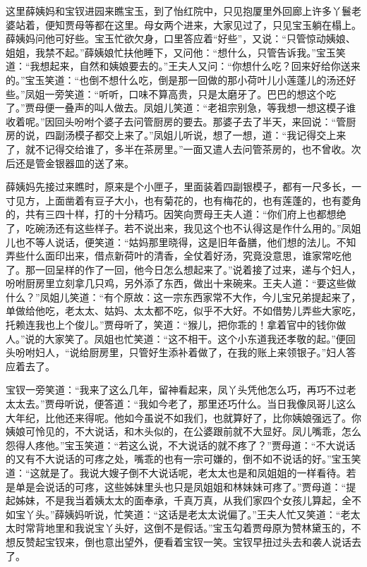 这里薛姨妈和宝钗进园来瞧宝玉，到了怡红院中，只见抱厦里外回廊上许多丫鬟老婆站着，便知贾母等都在这里。母女两个进来，大家见过了，只见宝玉躺在榻上。薛姨妈问他可好些。宝玉忙欲欠身，口里答应着``好些''，又说：``只管惊动姨娘、姐姐，我禁不起。''薛姨娘忙扶他睡下，又问他：``想什么，只管告诉我。''宝玉笑道：``我想起来，自然和姨娘要去的。''王夫人又问：``你想什么吃？回来好给你送来的。''宝玉笑道：``也倒不想什么吃，倒是那一回做的那小荷叶儿小莲蓬儿的汤还好些。''凤姐一旁笑道：``听听，口味不算高贵，只是太磨牙了。巴巴的想这个吃了。''贾母便一叠声的叫人做去。凤姐儿笑道：``老祖宗别急，等我想一想这模子谁收着呢。''因回头吩咐个婆子去问管厨房的要去。那婆子去了半天，来回说：``管厨房的说，四副汤模子都交上来了。''凤姐儿听说，想了一想，道：``我记得交上来了，就不记得交给谁了，多半在茶房里。''一面又遣人去问管茶房的，也不曾收。次后还是管金银器皿的送了来。

薛姨妈先接过来瞧时，原来是个小匣子，里面装着四副银模子，都有一尺多长，一寸见方，上面凿着有豆子大小，也有菊花的，也有梅花的，也有莲蓬的，也有菱角的，共有三四十样，打的十分精巧。因笑向贾母王夫人道：``你们府上也都想绝了，吃碗汤还有这些样子。若不说出来，我见这个也不认得这是作什么用的。''凤姐儿也不等人说话，便笑道：``姑妈那里晓得，这是旧年备膳，他们想的法儿。不知弄些什么面印出来，借点新荷叶的清香，全仗着好汤，究竟没意思，谁家常吃他了。那一回呈样的作了一回，他今日怎么想起来了。''说着接了过来，递与个妇人，吩咐厨房里立刻拿几只鸡，另外添了东西，做出十来碗来。王夫人道：``要这些做什么？''凤姐儿笑道：``有个原故：这一宗东西家常不大作，今儿宝兄弟提起来了，单做给他吃，老太太、姑妈、太太都不吃，似乎不大好。不如借势儿弄些大家吃，托赖连我也上个俊儿。''贾母听了，笑道：``猴儿，把你乖的！拿着官中的钱你做人。''说的大家笑了。凤姐也忙笑道：``这不相干。这个小东道我还孝敬的起。''便回头吩咐妇人，``说给厨房里，只管好生添补着做了，在我的账上来领银子。''妇人答应着去了。

宝钗一旁笑道：``我来了这么几年，留神看起来，凤丫头凭他怎么巧，再巧不过老太太去。''贾母听说，便答道：``我如今老了，那里还巧什么。当日我像凤哥儿这么大年纪，比他还来得呢。他如今虽说不如我们，也就算好了，比你姨娘强远了。你姨娘可怜见的，不大说话，和木头似的，在公婆跟前就不大显好。凤儿嘴乖，怎么怨得人疼他。''宝玉笑道：``若这么说，不大说话的就不疼了？''贾母道：``不大说话的又有不大说话的可疼之处，嘴乖的也有一宗可嫌的，倒不如不说话的好。''宝玉笑道：``这就是了。我说大嫂子倒不大说话呢，老太太也是和凤姐姐的一样看待。若是单是会说话的可疼，这些姊妹里头也只是凤姐姐和林妹妹可疼了。''贾母道：``提起姊妹，不是我当着姨太太的面奉承，千真万真，从我们家四个女孩儿算起，全不如宝丫头。''薛姨妈听说，忙笑道：``这话是老太太说偏了。''王夫人忙又笑道：``老太太时常背地里和我说宝丫头好，这倒不是假话。''宝玉勾着贾母原为赞林黛玉的，不想反赞起宝钗来，倒也意出望外，便看着宝钗一笑。宝钗早扭过头去和袭人说话去了。

